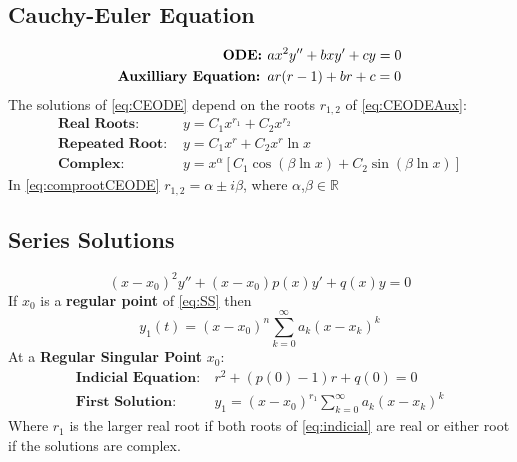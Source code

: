 \documentclass[10pt,portrait, leqno]{article}
\begin{document}
\begin{multicols}{2}
\subsection*{Cauchy-Euler Equation}
\begin{align}
\text{\textbf{ODE: }} &ax^2y''+bxy'+cy=0 \label{eq:CEODE}\\
\text{\textbf{Auxilliary Equation: }}& ar(r-1)+br+c=0\label{eq:CEODEAux}
\end{align}
The solutions of \eqref{eq:CEODE} depend on the roots $r_{1,2}$ of \eqref{eq:CEODEAux}: 
\begin{align}
\textbf{Real Roots: } &y = C_1x^{r_1} + C_2x^{r_2}\\
\textbf{Repeated Root: } &y = C_1 x^r + C_2 x^r \ln x\\
\textbf{Complex: } &y=x^{\alpha}[C_1\cos(\beta \ln x) + C_2 \sin (\beta \ln x)] \label{eq:comprootCEODE}
\end{align}
In \eqref{eq:comprootCEODE} $r_{1,2}=\alpha\pm i\beta$, where $\alpha$,$\beta\in\mathbb{R}$

\vspace{-1ex}\subsection*{Series Solutions}
\begin{equation}
(x-x_0)^2y''+(x-x_0)p(x)y'+q(x)y=0 \label{eq:SS}
\end{equation}
If $x_0$ is a \textbf{regular point} of \eqref{eq:SS} then 
\begin{equation}
y_1(t) = (x-x_0)^n\sum_{k=0}^{\infty}a_k(x-x_k)^k
\end{equation}
At a \textbf{Regular Singular Point } $x_0$: 
\begin{align}
\textbf{Indicial Equation:}\ &r^2+(p(0)-1)r + q(0)=0 \label{eq:indicial}\\
\textbf{First Solution: }\ &y_1=(x-x_0)^{r_1}\sum_{k=0}^{\infty}a_k(x-x_k)^k
\end{align}
Where $r_1$ is the larger real root if both roots of \eqref{eq:indicial}  are real or either root if the solutions are complex. 
\end{multicols}
\end{document}
